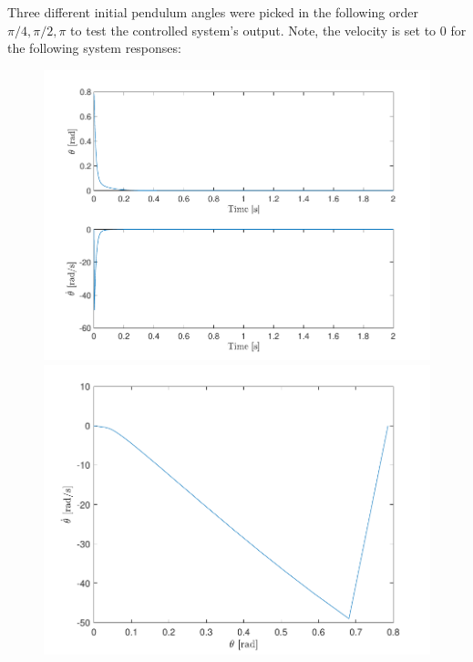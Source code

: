 \documentclass[10pt]{article}
\begin{document}
Three different initial pendulum angles were picked in the following order $\pi/4, \pi/2, \pi$ to test the controlled system's output. Note, the velocity is set to 0 for the following system responses:

\begin{figure}[ht]
    \centering
    \begin{minipage}[b]{0.45\textwidth}
        \centering
        \includegraphics[clip,width=1\linewidth]{lab1/figs/section7_controlled_state_evolution_x_0_3.pdf}
    \end{minipage}
    \begin{minipage}[b]{0.45\textwidth}
        \centering
        \includegraphics[clip,width=1\linewidth]{lab1/figs/section7_controlled_state_orbit_x_0_3.pdf}
    \end{minipage}
\end{figure}
\end{document}
